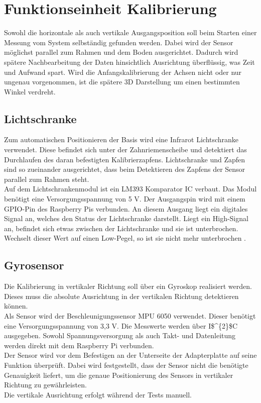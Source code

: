 \section{Funktionseinheit Kalibrierung}

Sowohl die horizontale als auch vertikale Ausgangsposition soll beim Starten einer Messung vom System selbständig gefunden werden. Dabei wird der Sensor möglichst parallel zum Rahmen und dem Boden ausgerichtet. Dadurch wird spätere Nachbearbeitung der Daten hinsichtlich Ausrichtung überflüssig, was Zeit und Aufwand spart. Wird die Anfangskalibrierung der Achsen nicht oder nur ungenau vorgenommen, ist die spätere 3D Darstellung um einen bestimmten Winkel verdreht.

\subsection{Lichtschranke}
Zum automatischen Positionieren der Basis wird eine Infrarot Lichtschranke verwendet. Diese befindet sich unter der Zahnriemenscheibe und detektiert das Durchlaufen des daran befestigten Kalibrierzapfens. Lichtschranke und Zapfen sind so zueinander ausgerichtet, dass beim Detektieren des Zapfens der Sensor parallel zum Rahmen steht.\\ 
Auf dem Lichtschrankenmodul ist ein LM393 Komparator \ac{IC} verbaut. Das Modul benötigt eine Versorgungsspannung von 5 V. Der Ausgangspin wird mit einem \ac{GPIO}-Pin des Raspberry Pis verbunden. An diesem Ausgang liegt ein digitales Signal an, welches den Status der Lichtschranke darstellt. Liegt ein High-Signal an, befindet sich etwas zwischen der Lichtschranke und sie ist unterbrochen. Wechselt dieser Wert auf einen Low-Pegel, so ist sie nicht mehr unterbrochen \cite{LM393}. 
\subsection{Gyrosensor}
Die Kalibrierung in vertikaler Richtung soll über ein Gyroskop realisiert werden. Dieses muss die absolute Ausrichtung in der vertikalen Richtung detektieren können. \\ 
Als Sensor wird der Beschleunigungssensor MPU 6050 verwendet. Dieser benötigt eine Versorgungsspannung von 3,3 V. Die Messwerte werden über \ac{I$^{2}$C} ausgegeben.\cite{MPU-6050} Sowohl Spannungsversorgung als auch Takt- und Datenleitung werden direkt mit dem Raspberry Pi verbunden. \\ 
Der Sensor wird vor dem Befestigen an der Unterseite der Adapterplatte auf seine Funktion überprüft. Dabei wird festgestellt, dass der Sensor nicht die benötigte Genauigkeit liefert, um die genaue Positionierung des Sensors in vertikaler Richtung zu gewährleisten. \\
Die vertikale Ausrichtung erfolgt während der Tests manuell.


